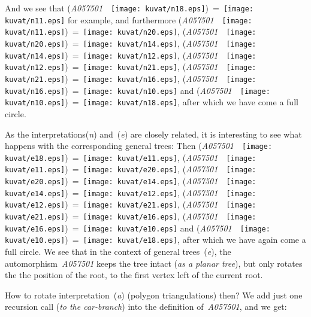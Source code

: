 \documentclass[11pt]{article} %
\newcommand{\catint}[1]{({\it #1})}
\newcommand{\autname}[1]{{\it *#1}}
\begin{document}
And we see that (\autname{A057501}~~\texttt{[image: kuvat/n18.eps]})~=~\texttt{[image: kuvat/n11.eps]} for example, and furthermore
(\autname{A057501}~~\texttt{[image: kuvat/n11.eps]})~=~\texttt{[image: kuvat/n20.eps]},
(\autname{A057501}~~\texttt{[image: kuvat/n20.eps]})~=~\texttt{[image: kuvat/n14.eps]},
(\autname{A057501}~~\texttt{[image: kuvat/n14.eps]})~=~\texttt{[image: kuvat/n12.eps]},
(\autname{A057501}~~\texttt{[image: kuvat/n12.eps]})~=~\texttt{[image: kuvat/n21.eps]},
(\autname{A057501}~~\texttt{[image: kuvat/n21.eps]})~=~\texttt{[image: kuvat/n16.eps]},
(\autname{A057501}~~\texttt{[image: kuvat/n16.eps]})~=~\texttt{[image: kuvat/n10.eps]} and
(\autname{A057501}~~\texttt{[image: kuvat/n10.eps]})~=~\texttt{[image: kuvat/n18.eps]},
after which we have come a full circle.

As the interpretations\catint{n} and~\catint{e} are closely related,
it is interesting to see what happens with the corresponding general trees:
Then (\autname{A057501}~~\texttt{[image: kuvat/e18.eps]})~=~\texttt{[image: kuvat/e11.eps]},
(\autname{A057501}~~\texttt{[image: kuvat/e11.eps]})~=~\texttt{[image: kuvat/e20.eps]},
(\autname{A057501}~~\texttt{[image: kuvat/e20.eps]})~=~\texttt{[image: kuvat/e14.eps]},
(\autname{A057501}~~\texttt{[image: kuvat/e14.eps]})~=~\texttt{[image: kuvat/e12.eps]},
(\autname{A057501}~~\texttt{[image: kuvat/e12.eps]})~=~\texttt{[image: kuvat/e21.eps]},
(\autname{A057501}~~\texttt{[image: kuvat/e21.eps]})~=~\texttt{[image: kuvat/e16.eps]},
(\autname{A057501}~~\texttt{[image: kuvat/e16.eps]})~=~\texttt{[image: kuvat/e10.eps]} and
(\autname{A057501}~~\texttt{[image: kuvat/e10.eps]})~=~\texttt{[image: kuvat/e18.eps]},
after which we have again come a full circle. We see that in the context
of general trees~\catint{e}, the automorphism~\autname{A057501} keeps
the tree intact (\textit{as a planar tree}), but only rotates the
the position of the root, to the first vertex left of the current root.



How to rotate interpretation~\catint{a} (polygon triangulations) then?
We add just one recursion call (\emph{to the car-branch}) into the
definition of~\autname{A057501}, and we get:
\end{document}
